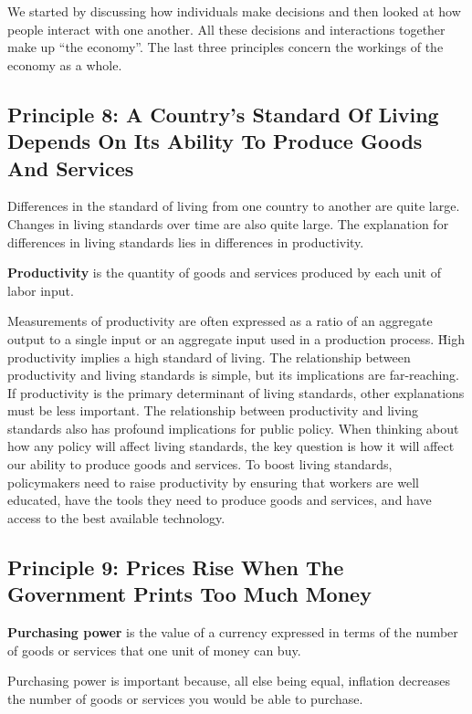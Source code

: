 We started by discussing how individuals make decisions and then looked at how people interact with one another. All
these decisions and interactions together make up ``the economy''. The last three principles concern the workings of
the economy as a whole.

\subsection*{Principle 8: A Country's Standard Of Living Depends On Its Ability To Produce Goods And Services}

Differences in the standard of living from one country to another are quite large. Changes in living standards over
time are also quite large. The explanation for differences in living standards lies in differences in productivity.

\bd[Productivity]
\textbf{Productivity} is the quantity of goods and services produced by each unit of labor input.
\ed

Measurements of productivity are often expressed as a ratio of an aggregate output to a single input or an aggregate
input used in a production process. \v

High productivity implies a high standard of living. The relationship between productivity and living standards is
simple, but its implications are far-reaching. If productivity is the primary determinant of living standards, other
explanations must be less important. The relationship between productivity and living standards also has profound
implications for public policy. When thinking about how any policy will affect living standards, the key question is
how it will affect our ability to produce goods and services. To boost living standards, policymakers need to raise
productivity by ensuring that workers are well educated, have the tools they need to produce goods and services, and
have access to the best available technology.

\subsection*{Principle 9: Prices Rise When The Government Prints Too Much Money}

\textbf{Purchasing power} is the value of a currency expressed in terms of the number of goods or services that one unit
of money can buy.
\ed

Purchasing power is important because, all else being equal, inflation decreases the number of goods or services you
would be able to purchase.

